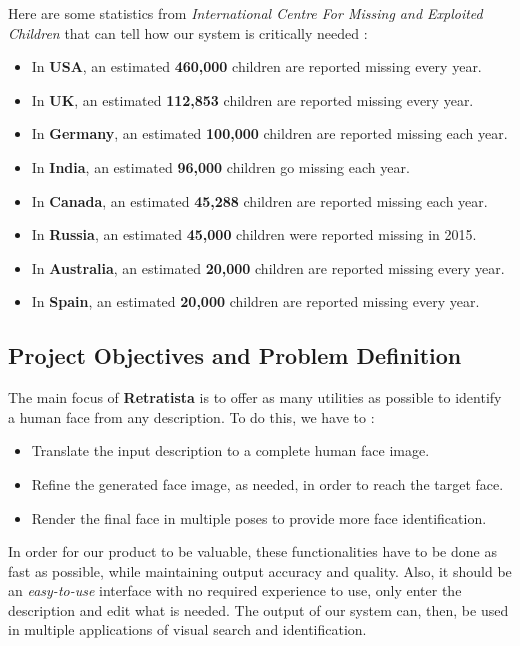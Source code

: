 Here are some statistics from \emph{International Centre For Missing and Exploited Children} that can tell how our system is critically needed :

\begin{itemize}
    \item In \textbf{USA}, an estimated \textbf{460,000} children are reported missing every year.
    \item In \textbf{UK}, an estimated \textbf{112,853} children are reported missing every year.
    \item In \textbf{Germany}, an estimated \textbf{100,000} children are reported missing each year.
    \item In \textbf{India}, an estimated \textbf{96,000} children go missing each year.
    \item In \textbf{Canada}, an estimated \textbf{45,288} children are reported missing each year.
    \item In \textbf{Russia}, an estimated \textbf{45,000} children were reported missing in 2015.
    \item In \textbf{Australia}, an estimated \textbf{20,000} children are reported missing every year.
    \item In \textbf{Spain}, an estimated \textbf{20,000} children are reported missing every year.
\end{itemize}

\subsection{Project Objectives and Problem Definition}
The main focus of \textbf{Retratista} is to offer as many utilities as possible to identify a human face from any description. To do this, we have to :
\begin{itemize}
    \item Translate the input description to a complete human face image.
    \item Refine the generated face image, as needed, in order to reach the target face.
    \item Render the final face in multiple poses to provide more face identification.
\end{itemize}

In order for our product to be valuable, these functionalities have to be done as fast as possible, while maintaining output accuracy and quality. Also, it should be an \emph{easy-to-use} interface with no required experience to use, only enter the description and edit what is needed. The output of our system can, then, be used in multiple applications of visual search and identification.

